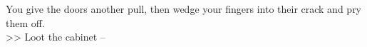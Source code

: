 You give the doors another pull, then wedge your fingers into their crack and pry them off.\\

>> Loot the cabinet -- 
